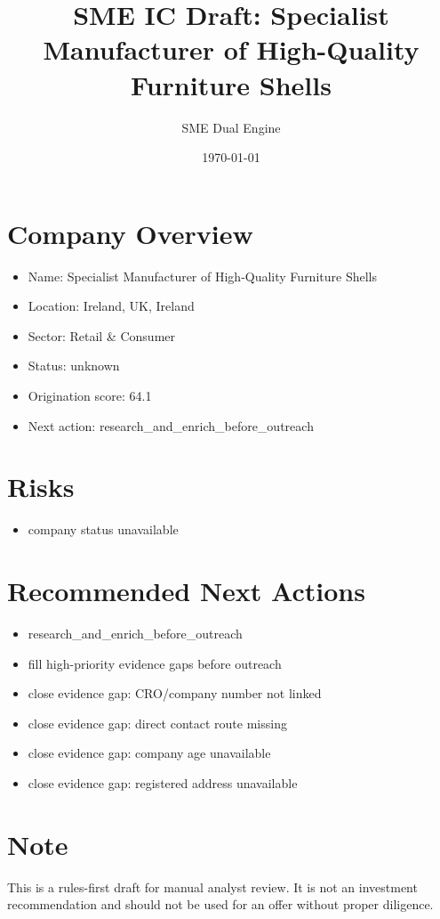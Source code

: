 \documentclass[11pt,a4paper]{article}
\title{SME IC Draft: Specialist Manufacturer of High-Quality Furniture Shells}
\author{SME Dual Engine}
\date{\today}
\begin{document}
\maketitle
\section*{Company Overview}
\begin{itemize}[leftmargin=1.4em]
\item Name: Specialist Manufacturer of High-Quality Furniture Shells
\item Location: Ireland, UK, Ireland
\item Sector: Retail \& Consumer
\item Status: unknown
\item Origination score: 64.1
\item Next action: research\_and\_enrich\_before\_outreach
\end{itemize}
\section*{Risks}
\begin{itemize}[leftmargin=1.4em]
\item company status unavailable
\end{itemize}
\section*{Recommended Next Actions}
\begin{itemize}[leftmargin=1.4em]
\item research\_and\_enrich\_before\_outreach
\item fill high-priority evidence gaps before outreach
\item close evidence gap: CRO/company number not linked
\item close evidence gap: direct contact route missing
\item close evidence gap: company age unavailable
\item close evidence gap: registered address unavailable
\end{itemize}
\section*{Note}
This is a rules-first draft for manual analyst review. It is not an investment
recommendation and should not be used for an offer without proper diligence.
\end{document}
